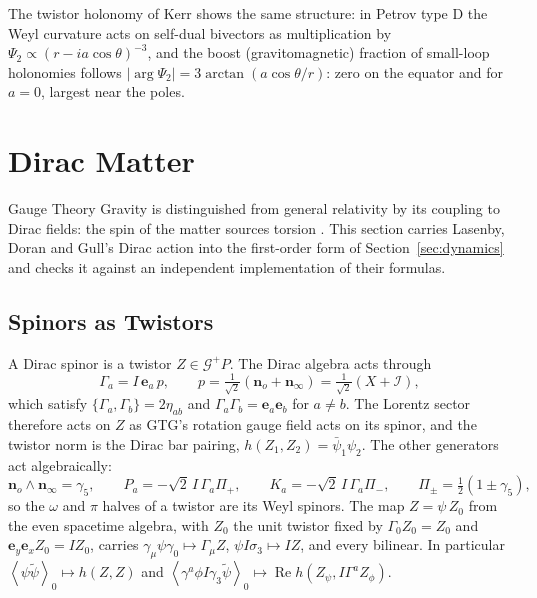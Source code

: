 \documentclass[11pt,a4paper]{article}
\newcommand{\G}{\mathcal{G}}
\newcommand{\nzero}{\mathbf{n}_o}
\newcommand{\ninf}{\mathbf{n}_\infty}
\newcommand{\e}{\mathbf{e}}
\newcommand{\rev}[1]{\widetilde{#1}}
\newcommand{\grade}[2]{\left\langle #1\right\rangle_{#2}}
\begin{document}
The twistor holonomy of Kerr shows the same structure: in Petrov type
D the Weyl curvature acts on self-dual bivectors as multiplication by
\(\Psi_2\propto(r-ia\cos\theta)^{-3}\), and the boost (gravitomagnetic)
fraction of small-loop holonomies follows
\(|\arg\Psi_2|=3\arctan(a\cos\theta/r)\): zero on the equator and for
\(a=0\), largest near the poles.

\section{Dirac Matter}
\label{sec:dirac}

Gauge Theory Gravity is distinguished from general relativity by its
coupling to Dirac fields: the spin of the matter sources torsion
\cite[Sections 3--4]{LDG}. This section carries Lasenby, Doran and Gull's Dirac
action into the first-order form of Section~\ref{sec:dynamics} and
checks it against an independent implementation of their formulas.

\subsection{Spinors as Twistors}

A Dirac spinor is a twistor \(Z\in\G^+P\). The Dirac algebra acts
through
\[
    \boxed{
        \Gamma_a=I\,\e_a\,p,
        \qquad
        p=\tfrac1{\sqrt2}\left(\nzero+\ninf\right)
        =\tfrac1{\sqrt2}\left(X+\mathcal I\right),
    }
\]
which satisfy \(\{\Gamma_a,\Gamma_b\}=2\eta_{ab}\) and
\(\Gamma_a\Gamma_b=\e_a\e_b\) for \(a\ne b\). The Lorentz sector
therefore acts on \(Z\) as GTG's rotation gauge field acts on its
spinor, and the twistor norm is the Dirac bar pairing,
\(h(Z_1,Z_2)=\bar\psi_1\psi_2\). The other generators act
algebraically:
\[
    \nzero\wedge\ninf=\gamma_5,
    \qquad
    P_a=-\sqrt2\,I\,\Gamma_a\Pi_+,
    \qquad
    K_a=-\sqrt2\,I\,\Gamma_a\Pi_-,
    \qquad
    \Pi_\pm=\tfrac12(1\pm\gamma_5),
\]
so the \(\omega\) and \(\pi\) halves of a twistor are its Weyl
spinors. The map \(Z=\psi\,Z_0\) from the even spacetime algebra, with
\(Z_0\) the unit twistor fixed by \(\Gamma_0Z_0=Z_0\) and
\(\e_y\e_xZ_0=IZ_0\), carries \(\gamma_\mu\psi\gamma_0\mapsto\Gamma_\mu Z\),
\(\psi I\sigma_3\mapsto IZ\), and every bilinear. In particular
\(\grade{\psi\rev\psi}{0}\mapsto h(Z,Z)\) and
\(\grade{\gamma^a\phi I\gamma_3\rev\psi}{0}\mapsto
\operatorname{Re}h(Z_\psi,I\Gamma^aZ_\phi)\).
\end{document}
